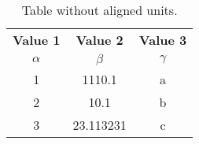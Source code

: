 \documentclass{article}
\begin{document}
	
	\begin{table}[h!]
		\begin{center}
			\caption{Table without aligned units.}
			\label{tab:table1}
			\begin{tabular}{c|c|c}
				\textbf{Value 1} & \textbf{Value 2} &
				\textbf{Value 3}\\
				$\alpha$ & $\beta$ & $\gamma$ \\
				\hline
				1 & 1110.1 & a\\
				2 & 10.1 & b\\
				3 & 23.113231 & c\\
			\end{tabular}
		\end{center}
	\end{table}
\end{document}
